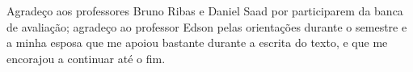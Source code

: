\begin{agradecimentos}
    Agradeço aos professores Bruno Ribas e Daniel Saad por participarem da banca de avaliação; agradeço ao professor Edson pelas orientações durante o semestre e a minha esposa que me apoiou bastante durante a escrita do texto, e que me encorajou a continuar até o fim.
\end{agradecimentos}
